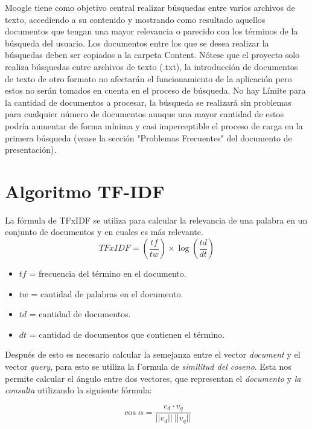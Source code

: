 \documentclass{article}
\begin{document}
\begin{center}
Moogle tiene como objetivo central realizar búsquedas entre varios archivos de texto, accediendo a su contenido y mostrando como resultado aquellos documentos que tengan una mayor relevancia o parecido con los términos de la búsqueda del usuario. Los documentos entre los que se desea realizar la búsquedas deben ser copiados a la carpeta Content. Nótese que el proyecto solo realiza búsquedas entre archivos de texto (.txt), la introducción de documentos de texto de otro formato no afectarán el funcionamiento de la aplicación pero estos no serán tomados en cuenta en el proceso de búsqueda. No hay Límite para la cantidad de documentos a procesar, la búsqueda se realizará sin problemas para cualquier número de documentos aunque una mayor cantidad de estos podría aumentar de forma mínima y casi imperceptible el proceso de carga en la primera búsqueda (vease la sección "Problemas Frecuentes" del documento de presentación).


\newpage
\section*{\textcolor{graphcolor}{{\centering Algoritmo TF-IDF}}}

La fórmula de TFxIDF se utiliza para calcular la relevancia de una palabra en un conjunto de documentos y en cuales es más relevante.
\begin{equation}
	TFxIDF = (\frac{tf}{tw}) \times \log(\frac{td}{dt})
\end{equation}

\begin{itemize}
	\item $tf$ = frecuencia del término en el documento.
	\item $tw$ = cantidad de palabras en el documento.
	\item $td$ = cantidad de documentos.
	\item $dt$ = cantidad de documentos que contienen el término.
\end{itemize}


Después de esto es necesario calcular la semejanza entre el vector {\it document} y el vector {\it query}, para esto se utiliza la f'ormula de {\it similitud del coseno}. Esta nos permite calcular el ángulo entre dos vectores, que representan el {\it documento} y {\it la consulta} utilizando la siguiente fórmula:

\begin{equation}
	\cos \alpha = \frac{v_d \cdot v_q}{||v_d|| ~ ||v_q||}
\end{equation}



\end{center}
\end{document}
